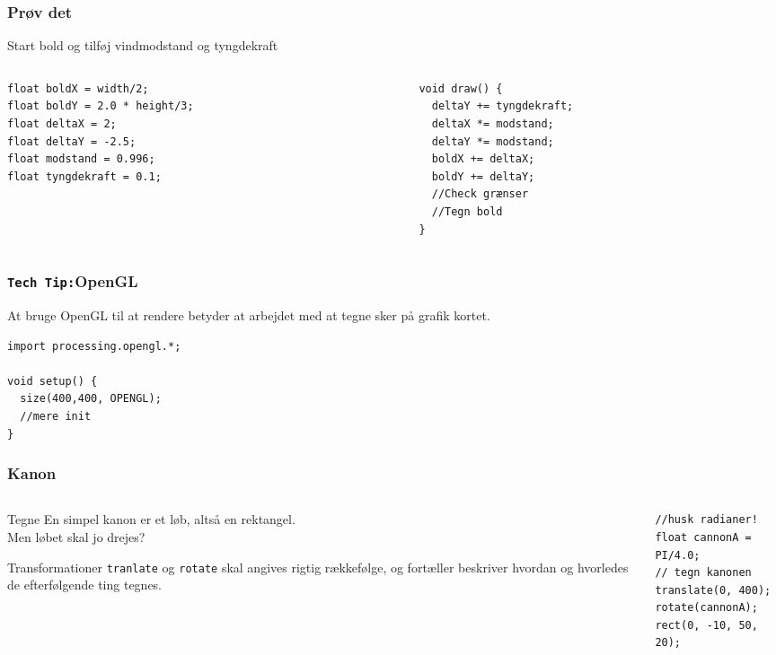 \documentclass{beamer}
\begin{document}
\begin{frame}[fragile]
  \frametitle{Prøv det}
Start bold og tilføj vindmodstand og tyngdekraft
  \begin{columns}
    \begin{column}{0.5\textwidth}
\begin{verbatim}
float boldX = width/2;
float boldY = 2.0 * height/3;
float deltaX = 2;
float deltaY = -2.5;
float modstand = 0.996;
float tyngdekraft = 0.1;
\end{verbatim}
    \end{column}
    \begin{column}{0.5\textwidth}
\begin{verbatim} 
void draw() {
  deltaY += tyngdekraft;
  deltaX *= modstand;
  deltaY *= modstand;
  boldX += deltaX;
  boldY += deltaY;
  //Check grænser
  //Tegn bold
}
\end{verbatim}

    \end{column}
  \end{columns}
\end{frame}


\begin{frame}[fragile]
  \frametitle{\texttt{Tech Tip:}OpenGL}

  At bruge OpenGL til at rendere betyder at arbejdet med at tegne sker
  på grafik kortet.

\begin{verbatim}
import processing.opengl.*;

void setup() {
  size(400,400, OPENGL);
  //mere init
}
\end{verbatim}
\end{frame}

\begin{frame}[fragile]
  \frametitle{Kanon}
  
  \begin{columns}
    \begin{column}{0.5\textwidth}
      
      \begin{block}{Tegne}
        En simpel kanon er et løb, altså en rektangel. \\
        Men løbet skal jo drejes?
      \end{block}

      \begin{block}{Transformationer}
        \texttt{tranlate} og \texttt{rotate} skal angives rigtig
        rækkefølge, og fortæller beskriver hvordan og hvorledes de
        efterfølgende ting tegnes.
      \end{block}

      
    \end{column}
    \begin{column}{0.5\textwidth}
\begin{verbatim} 
//husk radianer!
float cannonA = PI/4.0; 
// tegn kanonen
translate(0, 400);
rotate(cannonA); 
rect(0, -10, 50, 20);

\end{verbatim}
    \end{column}
  \end{columns}
\end{frame}
\end{document}

